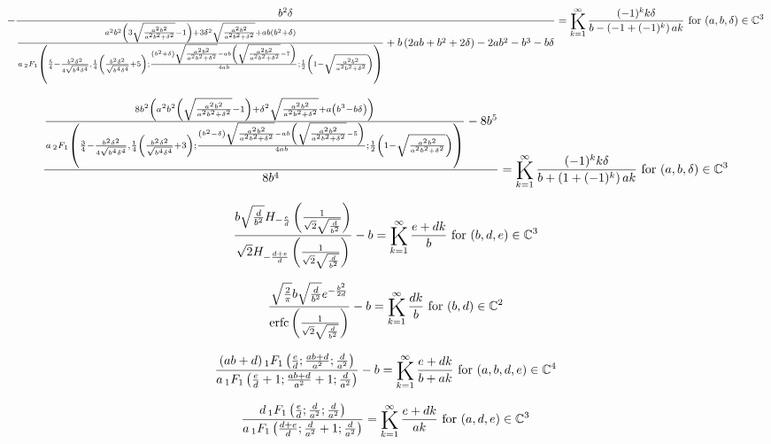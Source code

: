 \documentclass{article}
\newcommand{\bigK}{\mathop{\raisebox{-5pt}{\huge K}}}
\begin{document}
\[-\frac{b^2 \delta }{\frac{a^2 b^2 \left(3 \sqrt{\frac{a^2 b^2}{a^2 b^2+\delta ^2}}-1\right)+3 \delta ^2 \sqrt{\frac{a^2 b^2}{a^2 b^2+\delta ^2}}+a b \left(b^2+\delta \right)}{a \, _2F_1\left(\frac{5}{4}-\frac{b^2 \delta ^2}{4 \sqrt{b^4 \delta ^4}},\frac{1}{4} \left(\frac{b^2 \delta ^2}{\sqrt{b^4 \delta ^4}}+5\right);\frac{\left(b^2+\delta \right) \sqrt{\frac{a^2 b^2}{a^2 b^2+\delta ^2}}-a b \left(\sqrt{\frac{a^2 b^2}{a^2 b^2+\delta ^2}}-7\right)}{4 a b};\frac{1}{2} \left(1-\sqrt{\frac{a^2 b^2}{a^2 b^2+\delta ^2}}\right)\right)}+b \left(2 a b+b^2+2 \delta \right)-2 a b^2-b^3-b \delta }=\bigK_{k=1}^{\infty}\frac{(-1)^k k \delta }{b-\left(-1+(-1)^k\right) a k}\text{ for }(a,b,\delta )\in \mathbb{C}^3\] 

\[\frac{\frac{8 b^2 \left(a^2 b^2 \left(\sqrt{\frac{a^2 b^2}{a^2 b^2+\delta ^2}}-1\right)+\delta ^2 \sqrt{\frac{a^2 b^2}{a^2 b^2+\delta ^2}}+a \left(b^3-b \delta \right)\right)}{a \, _2F_1\left(\frac{3}{4}-\frac{b^2 \delta ^2}{4 \sqrt{b^4 \delta ^4}},\frac{1}{4} \left(\frac{b^2 \delta ^2}{\sqrt{b^4 \delta ^4}}+3\right);\frac{\left(b^2-\delta \right) \sqrt{\frac{a^2 b^2}{a^2 b^2+\delta ^2}}-a b \left(\sqrt{\frac{a^2 b^2}{a^2 b^2+\delta ^2}}-5\right)}{4 a b};\frac{1}{2} \left(1-\sqrt{\frac{a^2 b^2}{a^2 b^2+\delta ^2}}\right)\right)}-8 b^5}{8 b^4}=\bigK_{k=1}^{\infty}\frac{(-1)^k k \delta }{b+\left(1+(-1)^k\right) a k}\text{ for }(a,b,\delta )\in \mathbb{C}^3\] 

\[\frac{b \sqrt{\frac{d}{b^2}} H_{-\frac{e}{d}}\left(\frac{1}{\sqrt{2} \sqrt{\frac{d}{b^2}}}\right)}{\sqrt{2} H_{-\frac{d+e}{d}}\left(\frac{1}{\sqrt{2} \sqrt{\frac{d}{b^2}}}\right)}-b=\bigK_{k=1}^{\infty}\frac{e+d k}{b}\text{ for }(b,d,e)\in \mathbb{C}^3\] 

\[\frac{\sqrt{\frac{2}{\pi }} b \sqrt{\frac{d}{b^2}} e^{-\frac{b^2}{2 d}}}{\text{erfc}\left(\frac{1}{\sqrt{2} \sqrt{\frac{d}{b^2}}}\right)}-b=\bigK_{k=1}^{\infty}\frac{d k}{b}\text{ for }(b,d)\in \mathbb{C}^2\] 

\[\frac{(a b+d) \, _1F_1\left(\frac{e}{d};\frac{a b+d}{a^2};\frac{d}{a^2}\right)}{a \, _1F_1\left(\frac{e}{d}+1;\frac{a b+d}{a^2}+1;\frac{d}{a^2}\right)}-b=\bigK_{k=1}^{\infty}\frac{e+d k}{b+a k}\text{ for }(a,b,d,e)\in \mathbb{C}^4\] 

\[\frac{d \, _1F_1\left(\frac{e}{d};\frac{d}{a^2};\frac{d}{a^2}\right)}{a \, _1F_1\left(\frac{d+e}{d};\frac{d}{a^2}+1;\frac{d}{a^2}\right)}=\bigK_{k=1}^{\infty}\frac{e+d k}{a k}\text{ for }(a,d,e)\in \mathbb{C}^3\] 
\end{document}
